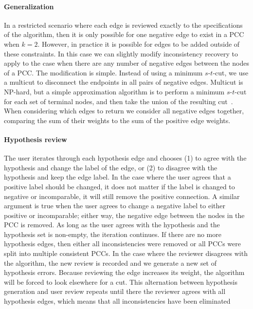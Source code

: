 \paragraph{Generalization}
In a restricted scenario where each edge is reviewed exactly to the specifications of the algorithm, then it is
  only possible for one negative edge to exist in a PCC when $k=2$.
However, in practice it is possible for edges to be added outside of these constraints.
In this case we can slightly modify inconsistency recovery to apply to the case when there are any number of
  negative edges between the nodes of a PCC.
The modification is simple.
Instead of using a minimum $s$-$t$-cut, we use a multicut to disconnect the endpoints in all pairs of negative
  edges.
Multicut is NP-hard, but a simple approximation algorithm is to perform a minimum $s$-$t$-cut for each set of
  terminal nodes, and then take the union of the resulting cut~\cite{vazirani_approximation_2013}.
When considering which edges to return we consider all negative edges together, comparing the sum of their
  weights to the sum of the positive edge weights.

\paragraph{Hypothesis review}
The user iterates through each hypothesis edge and chooses
(1) to agree with the hypothesis and change the label of the edge, or
(2) to disagree with the hypothesis and keep the edge label.
In the case where the user agrees that a positive label should be changed, it does not matter if the label is
  changed to negative or incomparable, it will still remove the positive connection.
A similar argument is true when the user agrees to change a negative label to either positive or incomparable;
  either way, the negative edge between the nodes in the PCC is removed.
As long as the user agrees with the hypothesis and the hypothesis set is non-empty, the iteration continues.
If there are no more hypothesis edges, then either all inconsistencies were removed or all PCCs were split into
  multiple consistent PCCs.
In the case where the reviewer disagrees with the algorithm, the new review is recorded and we generate a new set
  of hypothesis errors.
Because reviewing the edge increases its weight, the algorithm will be forced to look elsewhere for a cut.
This alternation between hypothesis generation and user review repeats until there the reviewer agrees with all
  hypothesis edges, which means that all inconsistencies have been eliminated

